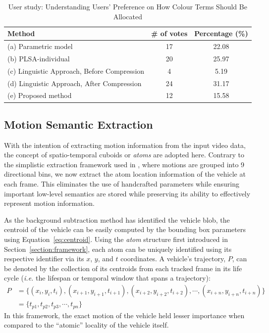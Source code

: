 \begin{table}[H]\centering
\begin{tabular}{|l|c|c|}
\hline
\textbf{Method}                             & \textbf{\# of votes} & \textbf{Percentage (\%)} \\ \hline
(a) Parametric model                        & 17                   & 22.08              \\ \hline
(b) PLSA-individual                         & 20                   & 25.97              \\ \hline
(c) Linguistic Approach, Before Compression & 4                    & 5.19              \\ \hline
(d) Linguistic Approach, After Compression  & 24                   & 31.17              \\ \hline
(e) Proposed method                         & 12                   & 15.58              \\ \hline
\end{tabular}
\caption{User study: Understanding Users' Preference on How Colour Terms Should Be Allocated}
\label{tab:munsell_result}
\end{table}
\vspace{-2em}


\subsection{Motion Semantic Extraction}
\label{subsec:chamferdistancemotionextraction}

With the intention of extracting motion information from the input video data, the concept of spatio-temporal cuboids or \emph{atoms} are adopted here. Contrary to the simplistic extraction framework used in \versionOneExt, where motions are grouped into 9 directional bins, we now extract the atom location information of the vehicle at each frame. This eliminates the use of handcrafted parameters while ensuring important low-level semantics are stored while preserving its ability to effectively represent motion information.

As the background subtraction method has identified the vehicle blob, the centroid of the vehicle can be easily computed by the bounding box parameters using Equation~\ref{eq:centroid}. Using the \emph{atom} structure first introduced in Section~\ref{section:framework}, each atom can be uniquely identified using its respective identifier via its $x$, $y$, and $t$ coordinates. A vehicle's trajectory, $P$, can be denoted by the collection of its centroids from each tracked frame in its life cycle (\emph{i.e.} the lifespan or temporal window that spans a trajectory):
\begin{align}
    P &= \{ (x_i, y_i, t_i), (x_{i+1}, y_{i+1}, t_{i+1}), (x_{i+2}, y_{i+2}, t_{i+2}), \dotsb,(x_{i+n}, y_{i+n}, t_{i+n})\}  \nonumber \\
      &= \{ t_{p1}, t_{p2}, t_{p3}, \dotsb, t_{pn}\}
\end{align}
In this framework, the exact motion of the vehicle held lesser importance when compared to the ``atomic'' locality of the vehicle itself.

